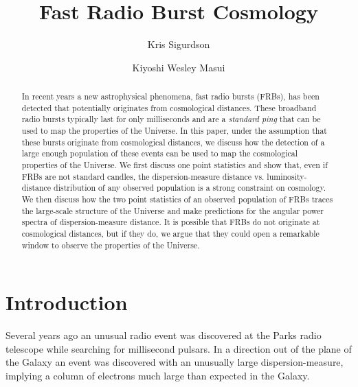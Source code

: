 \documentclass[twocolumn,prd,noshowpacs,nofootinbib,amsmath,amssymb]{revtex4}
\begin{document}
\title{Fast Radio Burst Cosmology}

\author{Kris Sigurdson}

\author{Kiyoshi Wesley Masui}



\begin{abstract}
In recent years a new astrophysical phenomena, fast radio bursts (FRBs), has been detected that potentially originates from cosmological distances.  These broadband radio bursts  typically last for only milliseconds and are a \emph{standard ping} that can be used to map the properties of the Universe.  In this paper,  under the assumption that these bursts originate from cosmological distances, we discuss how the detection of a large enough population of these events can be used to map the cosmological properties of the Universe.    We first discuss one point statistics and show that, even if FRBs are not standard candles, the dispersion-measure distance vs. luminosity-distance distribution of any observed population is a strong constraint on cosmology.  We then discuss how the two point statistics of an observed population of FRBs traces the large-scale structure of the Universe and make predictions for the angular power spectra of dispersion-measure distance.  It is possible that FRBs do not originate at cosmological distances, but if they do, we argue that they could open a remarkable window to observe the properties of the Universe.
\end{abstract}

\maketitle

%
%

\section{Introduction}
Several years ago an unusual radio event was discovered at the Parks radio telescope while searching for millisecond pulsars.  In a direction out of the plane of the Galaxy an event was discovered with an unusually large dispersion-measure, implying a column of electrons much large than expected in the Galaxy.
\end{document}
